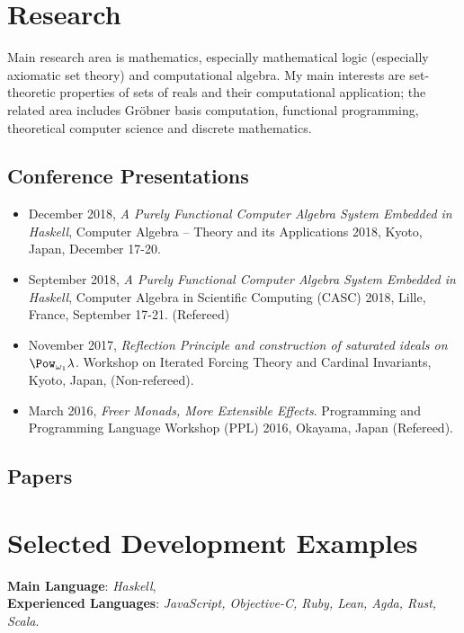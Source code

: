 \documentclass[letterpaper]{scrartcl}
\begin{document}
 \section*{Research}
 Main research area is mathematics, especially mathematical logic (especially axiomatic set theory) and computational algebra.
 My main interests are set-theoretic properties of sets of reals and their computational application; the related area includes Gr\"{o}bner basis computation, functional programming, theoretical computer science and discrete mathematics.

 \subsection*{Conference Presentations}
 \begin{itemize}
  \item December 2018, \emph{A Purely Functional Computer Algebra System Embedded in Haskell}, Computer Algebra -- Theory and its Applications 2018, Kyoto, Japan, December 17-20.
  \item September 2018, \emph{A Purely Functional Computer Algebra System Embedded in Haskell}, Computer Algebra in Scientific Computing (CASC) 2018, Lille, France, September 17-21. (Refereed)
  \item November 2017, \emph{Reflection Principle and construction of saturated ideals on $\Pow_{\omega_1} \lambda$}. Workshop on Iterated Forcing Theory and Cardinal Invariants, Kyoto, Japan, (Non-refereed).
  \item March 2016, \emph{Freer Monads, More Extensible Effects}. Programming and Programming Language Workshop (PPL) 2016, Okayama, Japan (Refereed).
 \end{itemize} 
\subsection*{Papers}
\nocite{Ishii:2019dp,ISHII:2018ek,ISHII:2016sf,Kiselyov:2015xy}
\printbibliography[heading=none]

\section*{Selected Development Examples}
\vspace{-1em}
\noindent \textbf{Main Language}: \emph{Haskell}, \\
\noindent \textbf{Experienced Languages}: \emph{JavaScript, Objective-C, Ruby, Lean, Agda, Rust, Scala}.
\vspace{-.5em}
\end{document}

